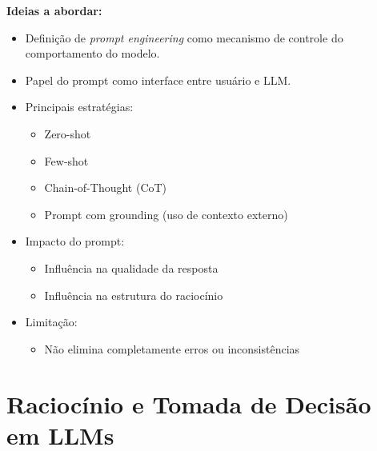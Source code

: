 \textbf{Ideias a abordar:}
\begin{itemize}
    \item Definição de \textit{prompt engineering} como mecanismo de controle do comportamento do modelo.
    \item Papel do prompt como interface entre usuário e LLM.
    \item Principais estratégias:
    \begin{itemize}
        \item Zero-shot
        \item Few-shot
        \item Chain-of-Thought (CoT)
        \item Prompt com grounding (uso de contexto externo)
    \end{itemize}
    \item Impacto do prompt:
    \begin{itemize}
        \item Influência na qualidade da resposta
        \item Influência na estrutura do raciocínio
    \end{itemize}
    \item Limitação:
    \begin{itemize}
        \item Não elimina completamente erros ou inconsistências
    \end{itemize}
\end{itemize}





\section{Raciocínio e Tomada de Decisão em LLMs}
\label{subsec:decision}

